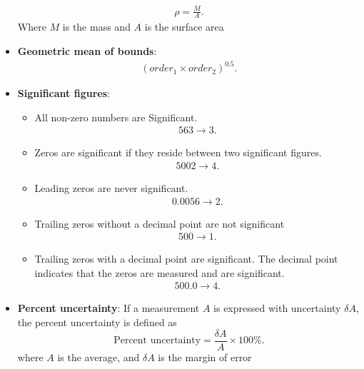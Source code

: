 \documentclass{report}
\begin{document}
\begin{itemize}
\begin{align*}
                \rho = \frac{M}{A}
            .\end{align*}
            Where $M$ is the mass and $A$ is the surface area
        \item \textbf{Geometric mean of bounds}:
            \begin{align*}
                (order_{1} \times order_{2})^{0.5}
            .\end{align*}
        \item \textbf{Significant figures}: 
            \begin{itemize}
                \item All non-zero numbers are Significant.
                    \begin{align*}
                        563 \rightarrow 3
                    .\end{align*}
                \item Zeros are significant if they reside between two significant figures.
                    \begin{align*}
                        5002 \rightarrow 4
                    .\end{align*}
                \item Leading zeros are never significant. 
                    \begin{align*}
                        0.0056 \rightarrow 2
                    .\end{align*}
                \item Trailing zeros without a decimal point are not significant
                    \begin{align*}
                        500 \rightarrow 1
                    .\end{align*}
                \item Trailing zeros with a decimal point are significant. The decimal point indicates that the zeros are measured and are significant. 
                    \begin{align*}
                        500.0 \rightarrow 4
                    .\end{align*}
            \end{itemize}
        \item \textbf{Percent uncertainty}: If a measurement \( A \) is expressed with uncertainty \( \delta A \), the percent uncertainty is defined as
            \[
                \text{Percent uncertainty} = \frac{\delta A}{A} \times 100\%.
            \]
            where $A$ is the average, and $\delta A$ is the margin of error

\end{itemize}
\end{document}
